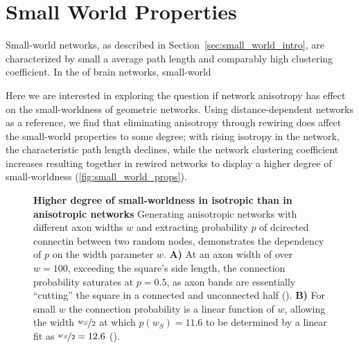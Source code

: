 

\newpage
\section{Small World Properties}\label{sec:small_world}

Small-world networks, as described in
Section~\ref{sec:small_world_intro}, are characterized by small a
average path length and comparably high clustering coefficient. In the
of brain networks, small-world

\parencite{Watts1998}

Here we are interested in exploring the question if network anisotropy
has effect on the small-worldness of geometric networks. Using
distance-dependent networks as a reference, we find that eliminating
anisotropy through rewiring does affect the small-world properties to
some degree; with rising isotropy in the network, the characteristic
path length declines, while the network clustering coefficient
increases resulting together in rewired networks to display a higher
degree of small-worldness (\autoref{fig:small_world_props}).

\begin{figure}[htp]
  \centering
  \caption{\textbf{Higher degree of small-worldness in
      isotropic than in anisotropic networks} Generating
    anisotropic networks with different axon widths $w$ and extracting
    probability $p$ of dcirected connectin between two random nodes,
    demonstrates the dependency of $p$ on the width parameter $w$.
    \textbf{A)} At an axon width of over $w=100$, exceeding the
    square's side length, the connection probability saturates at
    $p=0.5$, as axon bands are essentially \enquote{cutting} the
    square in a connected and unconnected half
    (). \textbf{B)} For small $w$ the connection
    probability is a linear function of $w$, allowing the width $\nicefrac{w_S}{2}$
    at which $p(w_S)=11.6$ to be determined by a linear fit as
    $\nicefrac{w_S}{2} =
    12.6$ ().} %
  \label{fig:small_world_props}
\end{figure}  


